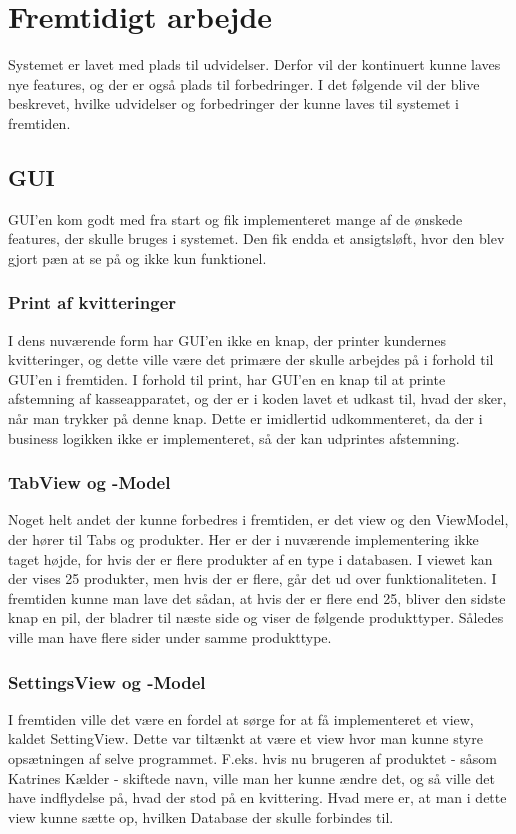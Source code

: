 \section{Fremtidigt arbejde}
Systemet er lavet med plads til udvidelser. Derfor vil der kontinuert kunne laves nye features, og der er også plads til forbedringer. I det følgende vil der blive beskrevet, hvilke udvidelser og forbedringer der kunne laves til systemet i fremtiden. 

\subsection{GUI}
GUI'en kom godt med fra start og fik implementeret mange af de ønskede features, der skulle bruges i systemet. Den fik endda et ansigtsløft, hvor den blev gjort pæn at se på og ikke kun funktionel.\newline 
\subsubsection{Print af kvitteringer}
I dens nuværende form har GUI'en ikke en knap, der printer kundernes kvitteringer, og dette ville være det primære der skulle arbejdes på i forhold til GUI'en i fremtiden. I forhold til print, har GUI'en en knap til at printe afstemning af kasseapparatet, og der er i koden lavet et udkast til, hvad der sker, når man trykker på denne knap. Dette er imidlertid udkommenteret, da der i business logikken ikke er implementeret, så der kan udprintes afstemning.\newline
\subsubsection{TabView og -Model}
Noget helt andet der kunne forbedres i fremtiden, er det view og den ViewModel, der hører til Tabs og produkter. Her er der i nuværende implementering ikke taget højde, for hvis der er flere produkter af en type i databasen. I viewet kan der vises 25 produkter, men hvis der er flere, går det ud over funktionaliteten. I fremtiden kunne man lave det sådan, at hvis der er flere end 25, bliver den sidste knap en pil, der bladrer til næste side og viser de følgende produkttyper. Således ville man have flere sider under samme produkttype.\newline
\subsubsection{SettingsView og -Model}
I fremtiden ville det være en fordel at sørge for at få implementeret et view, kaldet SettingView. Dette var tiltænkt at være et view hvor man kunne styre opsætningen af selve programmet. F.eks. hvis nu brugeren af produktet - såsom Katrines Kælder - skiftede navn, ville man her kunne ændre det, og så ville det have indflydelse på, hvad der stod på en kvittering. Hvad mere er, at man i dette view kunne sætte op, hvilken Database der skulle forbindes til. 

